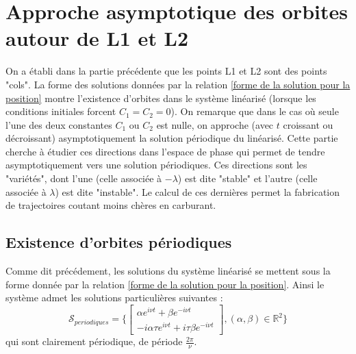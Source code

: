 \documentclass[12pt]{article}
\theoremstyle{definition}
\theoremstyle{definition}
\begin{document}
	\section{Approche asymptotique des orbites autour de L1 et L2}
	On a établi dans la partie précédente que les points L1 et L2 sont des points "cols". La forme des solutions données par la relation \ref{forme de la solution pour la position} montre l'existence d'orbites dans le système linéarisé (lorsque les conditions initiales forcent $C_1 = C_2 = 0$). On remarque que dans le cas où seule l'une des deux constantes $C_1$ ou $C_2$ est nulle, on approche (avec $t$ croissant ou décroissant) asymptotiquement la solution périodique du linéarisé. Cette partie cherche à étudier ces directions dans l'espace de phase qui permet de tendre asymptotiquement vers une solution périodiques. Ces directions sont les "variétés", dont l'une (celle associée à $-\lambda$) est dite "stable" et l'autre (celle associée à $\lambda$) est dite "instable". Le calcul de ces dernières permet la fabrication de trajectoires coutant moins chères en carburant.
	
	\subsection{Existence d'orbites périodiques}
	Comme dit précédement, les solutions du système linéarisé se mettent sous la forme donnée par la relation \ref{forme de la solution pour la position}. Ainsi le système admet les solutions particulières suivantes :
	\begin{equation}
		\mathcal{S}_{periodiques} = \{
		\begin{bmatrix}
			\alpha e^{i\nu t} + \beta e^{-i\nu t} \\
			-i \alpha \tau e^{i\nu t} + i \tau \beta e^{-i\nu t}
		\end{bmatrix}, (\alpha,\beta) \in \mathbb{R}^2
		\}
	\end{equation}
	qui sont clairement périodique, de période $\frac{2\pi}{\nu}$.
	
	
\end{document}
